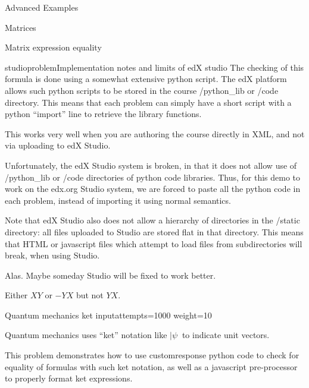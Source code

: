 \begin{edXchapter}{Advanced Examples}
\begin{edXsection}{Matrices}
\begin{edXvertical}
\begin{edXproblem}{Matrix expression equality}

\begin{edXshowhide}{studioproblem}{Implementation notes and limits of edX studio}
The checking of this formula is done using a somewhat extensive python
script.  The edX platform allows such python scripts to be stored in
the course /python_lib or /code directory.  This means that each
problem can simply have a short script with a python ``import'' line
to retrieve the library functions.

This works very well when you are authoring the course directly in
XML, and not via uploading to edX Studio.

Unfortunately, the edX Studio system is broken, in that it does
not allow use of /python_lib or /code directories of python
code libraries.  Thus, for this demo to work on the edx.org
Studio system, we are forced to paste all the python code
in each problem, instead of importing it using normal semantics.

Note that edX Studio also does not allow a hierarchy of directories in
the /static directory: all files uploaded to Studio are stored flat in
that directory.  This means that HTML or javascript files which
attempt to load files from subdirectories will break, when using
Studio.  

Alas.  Maybe someday Studio will be fixed to work better.  
\end{edXshowhide}

\begin{edXsolution}

Either $XY$ or $-YX$ but not $YX$.

\end{edXsolution}

\end{edXproblem}

\end{edXvertical}

\begin{edXvertical}

\begin{edXproblem}{Quantum mechanics ket input}{attempts=1000 weight=10}

Quantum mechanics uses ``ket'' notation like $|\psi\>$ to indicate unit
vectors.

This problem demonstrates how to use customresponse python code to
check for equality of formulas with such ket notation, as well as a
javascript pre-processor to properly format ket expressions.


\end{edXproblem}
\end{edXvertical}
\end{edXsection}
\end{edXchapter}
